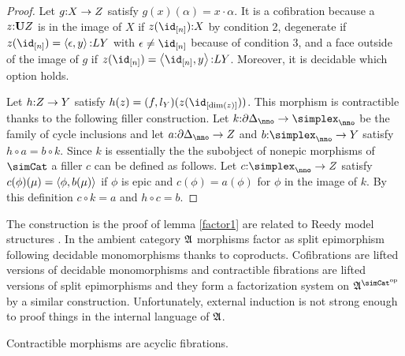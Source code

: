 \documentclass[csh.tex]{subfiles}
\begin{document}
\begin{proof}
Let $g\mathord : X\to Z$ satisfy $g(x)(\alpha) = x\cdot\alpha$. It is a cofibration because a $z\mathord :\mathbf{U} Z$ is in the image of $X$ if $z(\id_{[n]})\of X$ by condition 2, degenerate if $z(\id_{[n]})=\tuplet{\epsilon,y}\of LY$ with $\epsilon\neq \id_{[n]}$ because of condition 3,
and a face outside of the image of $g$ if $z(\id_{[n]})=\tuplet{\id_{[n]},y}\of LY$. Moreover, it is decidable which option holds.

Let $h\mathord : Z\to Y$ satisfy $h(z) = (f,l_Y)(z(\id_{[\dim(z)]}))$. This morphism is contractible thanks to the following filler construction.
Let $k\of\cycle_\nno\to\simplex_\nno$ be the family of cycle inclusions and let $a\of \cycle_\nno\to Z$ and $b\of \simplex_\nno\to Y$ satisfy $h\circ a = b\circ k$. Since $k$ is essentially the the subobject of nonepic morphisms of $\simCat$ a filler $c$ can be defined as follows.
Let $c\of \simplex_\nno\to Z$ satisfy $c(\phi)(\mu) = \left\langle \phi,b(\mu) \right\rangle$ if $\phi$ is epic and $c(\phi) = a(\phi)$ for $\phi$ in the image of $k$. By this definition $c\circ k = a$ and $h\circ c = b$.\end{proof}

\begin{remark} The construction is the proof of lemma \ref{factor1} are related to Reedy model structures \citep{Reedy74}. In the ambient category $\mathfrak A$ morphisms factor as split epimorphism following decidable monomorphisms thanks to coproducts. Cofibrations are lifted versions of decidable monomorphisms and contractible fibrations are lifted versions of split epimorphisms and they form a factorization system on $\ambient\s$ by a similar construction. Unfortunately, external induction is not strong enough to proof things in the internal language of $\mathfrak A$.
\end{remark}

\begin{lemma} Contractible morphisms are acyclic fibrations.\label{Reedy}\end{lemma}
\end{document}
